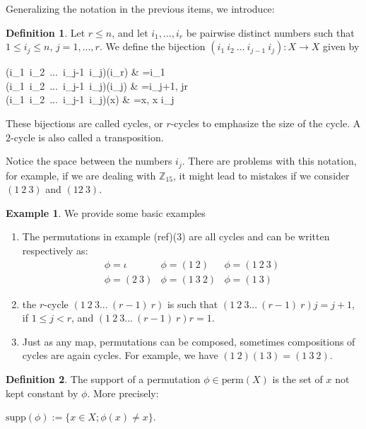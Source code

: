 \documentclass[]{article}
\theoremstyle{definition}
\newtheorem{definition}{Definition}[section]
\theoremstyle{definition}
\newtheorem{exmp}{Example}[section]
\newcommand{\raw}{\rightarrow}
\newcommand{\bb}{\mathbb}
\begin{document}
	Generalizing the notation in the previous items, we introduce:
	
	\begin{definition}
		Let $r \leq n$, and let $i_1, ...,  i_r$ be pairwise distinct numbers such that $1 \leq i_j \leq n$, $j=1, ..., r$. We define the bijection $(i_1\ i_2\ ...\ i_{j-1}\ i_j):X\raw X$ given by
		
		\begin{flalign*}
		(i_1\ i_2\ ...\ i_{j-1}\ i_j)(i_r) & =i_1 \\
		(i_1\ i_2\ ...\ i_{j-1}\ i_j)(i_j) & =i_{j+1}, j\neq r	\\ 
		(i_1\ i_2\ ...\ i_{j-1}\ i_j)(x) & =x, x \neq i_j		
		\end{flalign*}
		
		\noindent These bijections are called cycles, or $r$-cycles to emphasize the size of the cycle. A $2$-cycle is also called a transposition. 
	\end{definition}
	
	Notice the space between the numbers $i_j$. There are problems with this notation, for example, if we are dealing with $\bb{Z}_{15}$, it might lead to mistakes if we consider $(1\ 2\ 3)$ and $(12\ 3)$.
	
	
	\begin{exmp}
		We provide some basic examples
		\begin{enumerate}
			\item 	The permutations in example (ref)(3) are all cycles and can be written respectively as:
			$$\begin{array}{ccc}
			\phi = \iota	& \phi = (1\ 2) & \phi = (1\ 2\ 3) \\ 
			\phi =(2\ 3) & \phi = (1\ 3\ 2) & \phi = (1\ 3)
			\end{array}$$ 
			
			\item the $r$-cycle $(1\ 2\ 3...\ (r-1)\ r)$ is such that $ (1\ 2\ 3...\ (r-1)\ r)j = j+1$, if $1 \leq j < r$, and $(1\ 2\ 3...\ (r-1)\ r)r=1$.
			
			\item Just as any map, permutations can be composed, sometimes compositions of cycles are again cycles. For example, we have $(1 \ 2)(1 \ 3) = (1 \ 3 \ 2)$. 
		\end{enumerate}
		
	\end{exmp}
	
	
	\begin{definition}
		The support of a permutation $\phi \in \text{perm}(X)$ is the set of $x$ not kept constant by $\phi$. More precisely:
		
		\begin{center}
			$\text{supp}(\phi) := \{x \in X; \phi(x)\neq x  \}$.
		\end{center}
	\end{definition}
	
\end{document}
